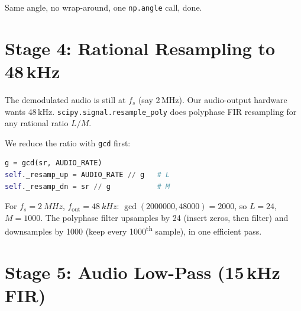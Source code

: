 \documentclass[11pt,a4paper]{article}
\begin{document}
Same angle, no wrap-around, one \texttt{np.angle} call, done.

\section{Stage 4: Rational Resampling to 48\,kHz}

The demodulated audio is still at \(f_s\) (say 2\,MHz).  Our
audio-output hardware wants 48\,kHz.  \texttt{scipy.signal.resample\_poly}
does polyphase FIR resampling for any rational ratio \(L/M\).

We reduce the ratio with \texttt{gcd} first:
\begin{lstlisting}[language=Python]
g = gcd(sr, AUDIO_RATE)
self._resamp_up = AUDIO_RATE // g   # L
self._resamp_dn = sr // g           # M
\end{lstlisting}

For \(f_s=\SI{2}{MHz}\), \(f_{\text{out}}=\SI{48}{kHz}\):
\(\gcd(2000000, 48000)=2000\), so \(L=24\), \(M=1000\).  The polyphase
filter upsamples by 24 (insert zeros, then filter) and downsamples by
1000 (keep every 1000\textsuperscript{th} sample), in one efficient pass.

\begin{center}
\end{center}

\section{Stage 5: Audio Low-Pass (15\,kHz FIR)}
\end{document}
